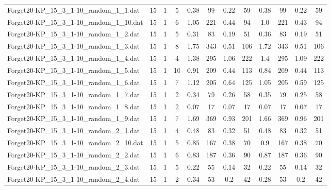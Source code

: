 \begin{sidewaystable}[!ht]
{\begin{tabular}{lccccccccccc}
Forget20-KP\_15\_3\_1-10\_random\_1\_1.dat & 15 & 1 & 5 & 0.38 & 99 &  \textcolor{blue2}{0.22} & 59 & 0.38 & 99 &  \textcolor{blue2}{0.22} & 59 \\
Forget20-KP\_15\_3\_1-10\_random\_1\_10.dat & 15 & 1 & 6 & 1.05 & 221 & 0.44 & 94 & 1.0 & 221 &  \textcolor{blue2}{0.43} & 94 \\
Forget20-KP\_15\_3\_1-10\_random\_1\_2.dat & 15 & 1 & 5 & 0.31 & 83 &  \textcolor{blue2}{0.19} & 51 & 0.36 & 83 &  \textcolor{blue2}{0.19} & 51 \\
Forget20-KP\_15\_3\_1-10\_random\_1\_3.dat & 15 & 1 & 8 & 1.75 & 343 &  \textcolor{blue2}{0.51} & 106 & 1.72 & 343 &  \textcolor{blue2}{0.51} & 106 \\
Forget20-KP\_15\_3\_1-10\_random\_1\_4.dat & 15 & 1 & 4 & 1.38 & 295 & 1.06 & 222 & 1.4 & 295 & 1.09 & 222 \\
Forget20-KP\_15\_3\_1-10\_random\_1\_5.dat & 15 & 1 & 10 & 0.91 & 209 &  \textcolor{blue2}{0.44} & 113 & 0.84 & 209 &  \textcolor{blue2}{0.44} & 113 \\
Forget20-KP\_15\_3\_1-10\_random\_1\_6.dat & 15 & 1 & 7 & 1.12 & 205 & 0.64 & 125 & 1.05 & 205 &  \textcolor{blue2}{0.59} & 125 \\
Forget20-KP\_15\_3\_1-10\_random\_1\_7.dat & 15 & 1 & 2 & 0.34 & 79 & 0.26 & 58 & 0.35 & 79 &  \textcolor{blue2}{0.25} & 58 \\
Forget20-KP\_15\_3\_1-10\_random\_1\_8.dat & 15 & 1 & 2 &  \textcolor{blue2}{0.07} & 17 &  \textcolor{blue2}{0.07} & 17 &  \textcolor{blue2}{0.07} & 17 &  \textcolor{blue2}{0.07} & 17 \\
Forget20-KP\_15\_3\_1-10\_random\_1\_9.dat & 15 & 1 & 7 & 1.69 & 369 &  \textcolor{blue2}{0.93} & 201 & 1.66 & 369 & 0.96 & 201 \\
Forget20-KP\_15\_3\_1-10\_random\_2\_1.dat & 15 & 1 & 4 & 0.48 & 83 &  \textcolor{blue2}{0.32} & 51 & 0.48 & 83 &  \textcolor{blue2}{0.32} & 51 \\
Forget20-KP\_15\_3\_1-10\_random\_2\_10.dat & 15 & 1 & 5 & 0.85 & 167 &  \textcolor{blue2}{0.38} & 70 & 0.9 & 167 &  \textcolor{blue2}{0.38} & 70 \\
Forget20-KP\_15\_3\_1-10\_random\_2\_2.dat & 15 & 1 & 6 & 0.83 & 187 &  \textcolor{blue2}{0.36} & 90 & 0.87 & 187 &  \textcolor{blue2}{0.36} & 90 \\
Forget20-KP\_15\_3\_1-10\_random\_2\_3.dat & 15 & 1 & 5 & 0.22 & 55 &  \textcolor{blue2}{0.14} & 32 & 0.22 & 55 &  \textcolor{blue2}{0.14} & 32 \\
Forget20-KP\_15\_3\_1-10\_random\_2\_4.dat & 15 & 1 & 2 & 0.34 & 53 &  \textcolor{blue2}{0.2} & 42 & 0.28 & 53 &  \textcolor{blue2}{0.2} & 42 \\

\end{tabular}}
\end{sidewaystable}
